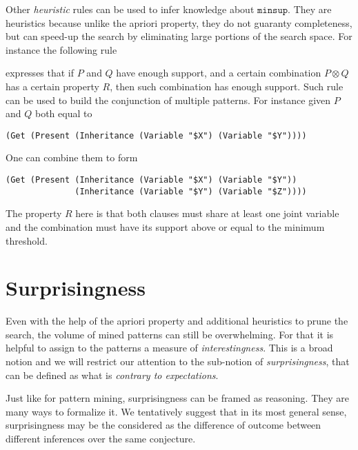 \documentclass[runningheads]{llncs}
\begin{document}
Other \emph{heuristic} rules can be used to infer knowledge about
$\texttt{minsup}$. They are heuristics because unlike the apriori
property, they do not guaranty completeness, but can speed-up the
search by eliminating large portions of the search space. For instance
the following rule
\begin{prooftree}
\end{prooftree}
expresses that if $P$ and $Q$ have enough support, and a certain
combination $P\otimes Q$ has a certain property $R$, then such
combination has enough support. Such rule can be used to build the
conjunction of multiple patterns. For instance given $P$ and $Q$ both
equal to
\begin{verbatim}
(Get (Present (Inheritance (Variable "$X") (Variable "$Y"))))
\end{verbatim}
One can combine them to form
\begin{verbatim}
(Get (Present (Inheritance (Variable "$X") (Variable "$Y"))
              (Inheritance (Variable "$Y") (Variable "$Z"))))
\end{verbatim}
The property $R$ here is that both clauses must share at least one
joint variable and the combination must have its support above or
equal to the minimum threshold.

\section{Surprisingness}
\label{SUR}

Even with the help of the apriori property and additional heuristics
to prune the search, the volume of mined patterns can still be
overwhelming. For that it is helpful to assign to the patterns a
measure of \emph{interestingness}. This is a broad notion and we will
restrict our attention to the sub-notion of \emph{surprisingness},
that can be defined as what is \emph{contrary to expectations}.

Just like for pattern mining, surprisingness can be framed as
reasoning. They are many ways to formalize it.  We tentatively suggest that in its
most general sense, surprisingness may be the considered as the difference of outcome
between different inferences over the same conjecture. 
\end{document}

